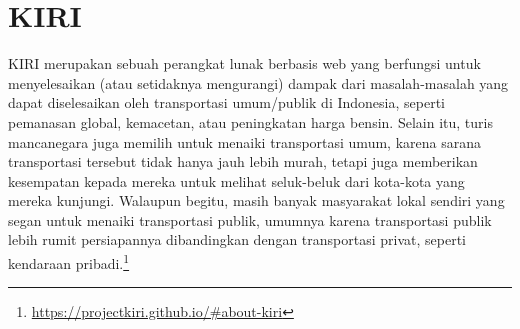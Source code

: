 \begin{comment}
\subsection{Tipe Antarmuka \textit{Command Line}}
\label{sec:commandline-type}

Berdasarkan sumber dari perangkat lunak \cl, antarmuka \cl dibagi menjadi dua, yaitu \cli dari OS dan aplikasi \cli.

\subsubsection{OS (\textit{Built-In})}
\label{sec:commandline-type-os}
Antarmuka \cl tipe ini merupakan antarmuka bawaan, dalam arti bahwa perangkat lunak ini sudah diikutkan dalam instalasi sistem operasi oleh pengguna. Dua contoh dari \cli tipe ini yang paling umum adalah \textit{cmd.exe} dalam sistem operasi Windows dan \textit{bash} dalam sistem operasi Linux.

\subsubsection{Aplikasi}
\label{sec:commandline-type-app}
Antarmuka \cl tipe ini merupakan antarmuka yang datang sebagai fitur dari aplikasi tertentu, baik dari pembuat yang sama dengan sistem operasi yang terdapat di perangkat milik pengguna (tapi bukan bawaan), atau dari pihak ketiga. Tipe ini biasanya banyak ditemukan dalam perangkat lunak zaman dahulu\textemdash spesifiknya, tahun-tahun ketika GUI masih belum merupakan teknologi yang mudah diimplementasikan. Walaupun begitu, pada zaman sekarang pun, masih banyak juga perangkat lunak yang memilih tipe antarmuka CLI dari pada GUI. Salah satu dari contoh aplikasi antarmuka tipe ini adalah Git.
\end{comment}

\section{KIRI}
\label{sec:kiri}

KIRI merupakan sebuah perangkat lunak berbasis web yang berfungsi untuk menyelesaikan (atau setidaknya mengurangi) dampak dari masalah-masalah yang dapat diselesaikan oleh transportasi umum/publik di Indonesia, seperti pemanasan global, kemacetan, atau peningkatan harga bensin. Selain itu, turis mancanegara juga memilih untuk menaiki transportasi umum, karena sarana transportasi tersebut tidak hanya jauh lebih murah, tetapi juga memberikan kesempatan kepada mereka untuk melihat seluk-beluk dari kota-kota yang mereka kunjungi. Walaupun begitu, masih banyak masyarakat lokal sendiri yang segan untuk menaiki transportasi publik, umumnya karena transportasi publik lebih rumit persiapannya dibandingkan dengan transportasi privat, seperti kendaraan pribadi.\footnote{\href{https://projectkiri.github.io/\#about-kiri}{https://projectkiri.github.io/\#about-kiri}}

